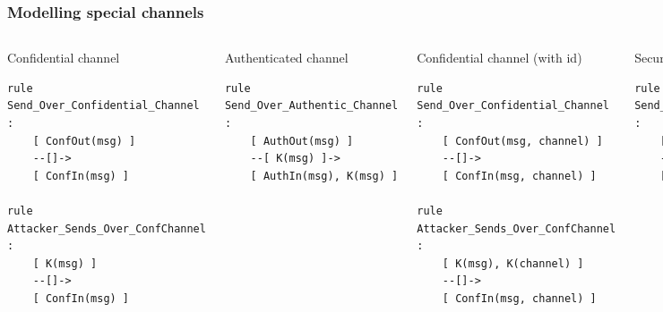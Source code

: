 \documentclass[aspectratio=169,t,xcolor=table]{beamer}
\begin{document}
\begin{frame}[fragile]
    \frametitle{Modelling special channels}
        \begin{columns}
            \begin{block}{Confidential channel}
            \begin{lstlisting}[language=Tamarin]
rule Send_Over_Confidential_Channel :
    [ ConfOut(msg) ]
    --[]->
    [ ConfIn(msg) ]
    
rule Attacker_Sends_Over_ConfChannel :
    [ K(msg) ]
    --[]->
    [ ConfIn(msg) ]\end{lstlisting}
            \end{block}

            \begin{block}{Authenticated channel}
            \begin{lstlisting}[language=Tamarin]
rule Send_Over_Authentic_Channel :
    [ AuthOut(msg) ]
    --[ K(msg) ]->
    [ AuthIn(msg), K(msg) ]\end{lstlisting}
            \end{block}

            \begin{block}{Confidential channel (with id)}
            \begin{lstlisting}[language=Tamarin]
rule Send_Over_Confidential_Channel :
    [ ConfOut(msg, channel) ]
    --[]->
    [ ConfIn(msg, channel) ]
            
rule Attacker_Sends_Over_ConfChannel :
    [ K(msg), K(channel) ]
    --[]->
    [ ConfIn(msg, channel) ]\end{lstlisting}
            \end{block}

            \begin{block}{Secure channel}
            \begin{lstlisting}[language=Tamarin]
rule Send_Over_Secure_Channel :
    [ SecOut(msg) ]
    --[]->
    [ SecIn(msg) ]\end{lstlisting}
            \end{block}
        \end{columns}
\end{frame}
\end{document}
